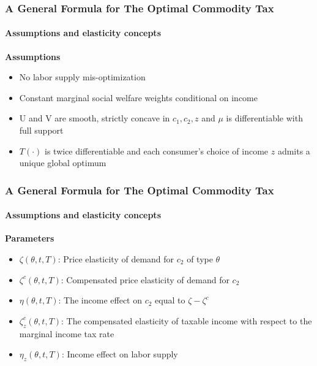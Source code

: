 \documentclass{beamer}
\begin{document}
\begin{frame}
\frametitle{A General Formula for The Optimal Commodity Tax}
\framesubtitle{Assumptions and elasticity concepts}

\textbf{Assumptions}
\begin{itemize}
	\item No labor supply mis-optimization
	\item Constant marginal social welfare weights conditional on income 
	\item U and V are smooth, strictly concave in $c_1, c_2, z$ and $\mu$ is differentiable with full support 
	\item $T(\cdot)$ is twice differentiable and each consumer's choice of income $z$ admits a unique global optimum
	
\end{itemize}

\end{frame}




\begin{frame}
\frametitle{A General Formula for The Optimal Commodity Tax}
\framesubtitle{Assumptions and elasticity concepts}

\textbf{Parameters}
\begin{itemize}
	\item $\zeta(\theta,t,T)$: Price elasticity of demand for $c_2$ of type $\theta$
	\item  $\zeta^c(\theta,t,T)$: Compensated price elasticity of demand for $c_2$
	\item $\eta(\theta, t,T)$: The income effect on $c_2$ equal to $\zeta -\zeta^c $
	\item  $\zeta^c_z(\theta,t,T)$: The compensated elasticity of taxable income with respect to the marginal income tax rate 
	\item $\eta_z(\theta, t,T)$: Income effect on labor supply
	
\end{itemize}

\end{frame}
\end{document}
